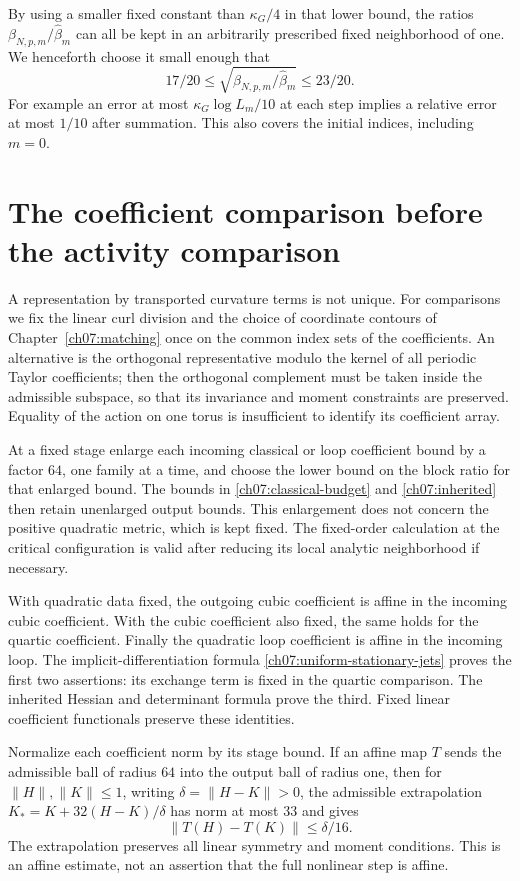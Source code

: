 By using a smaller fixed constant than $\kappa_G/4$ in that lower bound,
the ratios $\beta_{N,p,m}/\widehat\beta_m$ can all be kept in an
arbitrarily prescribed fixed neighborhood of one. We henceforth
choose it small enough that
\[
 17/20\le\sqrt{\beta_{N,p,m}/\widehat\beta_m}\le23/20.
\]
For example an error at most $\kappa_G\log L_m/10$ at each step
implies a relative error at most $1/10$ after summation. This also
covers the initial indices, including $m=0$.

\section{The coefficient comparison before the activity comparison}
\label{ch10:path-stability}

A representation by transported curvature terms is not unique.
For comparisons we fix the linear curl division and the choice of coordinate contours
of Chapter~\ref{ch07:matching} once on the common
index sets of the coefficients. An alternative is the orthogonal
representative modulo the kernel of all periodic Taylor coefficients;
then the orthogonal complement must be taken inside the admissible
subspace, so that its invariance and moment constraints are preserved.
Equality of the action on one torus is insufficient to identify its
coefficient array.

At a fixed stage enlarge each incoming classical or loop coefficient bound
by a factor $64$, one family at a time, and choose the lower bound on the block ratio
for that enlarged bound. The bounds in
\eqref{ch07:classical-budget} and \eqref{ch07:inherited} then retain
unenlarged output bounds. This enlargement does not concern the
positive quadratic metric, which is kept fixed. The fixed-order
calculation at the critical configuration is valid after reducing its local analytic
neighborhood if necessary.

With quadratic data fixed, the outgoing cubic coefficient is affine
in the incoming cubic coefficient. With the cubic coefficient also
fixed, the same holds for the quartic coefficient. Finally the
quadratic loop coefficient is affine in the incoming loop. The
implicit-differentiation formula \eqref{ch07:uniform-stationary-jets} proves the
first two assertions: its exchange term is fixed in the quartic
comparison. The inherited Hessian and determinant formula prove the
third. Fixed linear coefficient functionals preserve these identities.

Normalize each coefficient norm by its stage bound. If an affine
map $T$ sends the admissible ball of radius $64$ into the output ball
of radius one, then for $\|H\|,\|K\|\le1$, writing
$\delta=\|H-K\|>0$, the admissible extrapolation
$K_*=K+32(H-K)/\delta$ has norm at most $33$ and gives
\begin{equation}\label{ch10:affine-contraction}
 \|T(H)-T(K)\|\le\delta/16.
\end{equation}
The extrapolation preserves all linear symmetry and moment conditions.
This is an affine estimate, not an assertion that the full nonlinear
step is affine.

